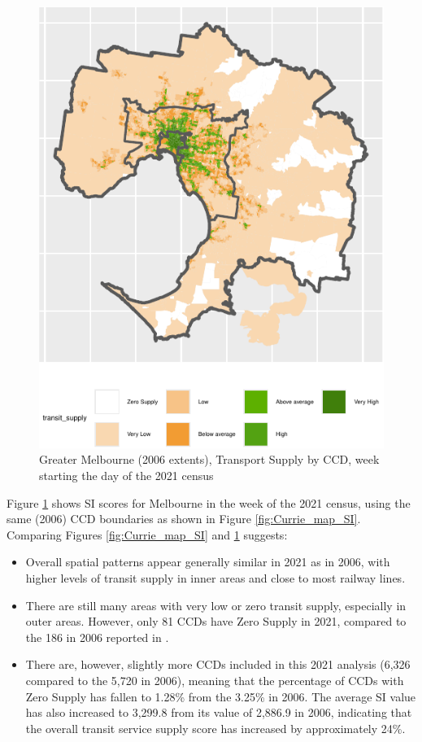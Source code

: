 \documentclass[preprint, 3p,
authoryear]{elsarticle} %
\providecommand{\tightlist}{%
  \setlength{\itemsep}{0pt}\setlength{\parskip}{0pt}}
\begin{document}
\begin{figure}
\includegraphics[width=1\linewidth]{Leveraging_GTFS_to_assess_transit_supply_Transport_Geography_files/figure-latex/Greater_Melbourne_CCD_2021-1} \caption{Greater Melbourne (2006 extents), Transport Supply by CCD, week starting the day of the 2021 census}\label{fig:Greater_Melbourne_CCD_2021}
\end{figure}

Figure \ref{fig:Greater_Melbourne_CCD_2021} shows SI scores for
Melbourne in the week of the 2021 census, using the same (2006) CCD
boundaries as shown in Figure \ref{fig:Currie_map_SI}. Comparing Figures
\ref{fig:Currie_map_SI} and \ref{fig:Greater_Melbourne_CCD_2021}
suggests:

\begin{itemize}
\tightlist
\item
  Overall spatial patterns appear generally similar in 2021 as in 2006,
  with higher levels of transit supply in inner areas and close to most
  railway lines.
\item
  There are still many areas with very low or zero transit supply,
  especially in outer areas. However, only 81 CCDs have Zero Supply in
  2021, compared to the 186 in 2006 reported in
  \citet{currie2010identifying}.
\item
  There are, however, slightly more CCDs included in this 2021 analysis
  (6,326 compared to the 5,720 in 2006), meaning that the percentage of
  CCDs with Zero Supply has fallen to 1.28\% from the 3.25\% in 2006.
  The average SI value has also increased to 3,299.8 from its value of
  2,886.9 in 2006, indicating that the overall transit service supply
  score has increased by approximately 24\%.
\end{itemize}
\end{document}
